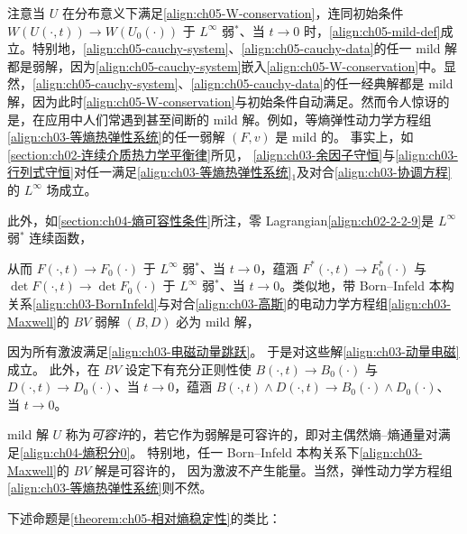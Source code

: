 \documentclass[../../main.tex]{subfiles}
\begin{document}
注意当 $U$ 在分布意义下满足\eqref{align:ch05-W-conservation}，连同初始条件 $W(U(\cdot,t))\to W(U_{0}(\cdot))$ 于 $L^{\infty}$ 弱$^{*}$、当 $t\to0$ 时，\eqref{align:ch05-mild-def}成立。特别地，\eqref{align:ch05-cauchy-system}、\eqref{align:ch05-cauchy-data}的任一 mild 解都是弱解，因为\eqref{align:ch05-cauchy-system}嵌入\eqref{align:ch05-W-conservation}中。显然，\eqref{align:ch05-cauchy-system}、\eqref{align:ch05-cauchy-data}的任一经典解都是 mild 解，因为此时\eqref{align:ch05-W-conservation}与初始条件自动满足。然而令人惊讶的是，在应用中人们常遇到甚至间断的 mild 解。例如，等熵弹性动力学方程组\eqref{align:ch03-等熵热弹性系统}的任一弱解 $(F,v)$ 是 mild 的。
事实上，如\cref{section:ch02-连续介质热力学平衡律}所见，
\eqref{align:ch03-余因子守恒}与\eqref{align:ch03-行列式守恒}对任一满足\eqref{align:ch03-等熵热弹性系统}$_{1}$及对合\eqref{align:ch03-协调方程}的 $L^{\infty}$ 场成立。



此外，如\cref{section:ch04-熵可容性条件}所注，零 Lagrangian\eqref{align:ch02-2-2-9}是 $L^{\infty}$ 弱$^{*}$ 连续函数，

从而 $F(\cdot,t)\to F_{0}(\cdot)$ 于 $L^{\infty}$ 弱$^{*}$、当 $t\to0$，蕴涵 $F^{*}(\cdot,t)\to F_{0}^{*}(\cdot)$ 与 $\det F(\cdot,t)\to\det F_{0}(\cdot)$ 于 $L^{\infty}$ 弱$^{*}$、当 $t\to0$。类似地，带 Born--Infeld 本构关系\eqref{align:ch03-BornInfeld}与对合\eqref{align:ch03-高斯}的电动力学方程组\eqref{align:ch03-Maxwell}的 $BV$ 弱解 $(B,D)$ 必为 mild 解，


因为所有激波满足\eqref{align:ch03-电磁动量跳跃}。
于是对这些解\eqref{align:ch03-动量电磁}成立。
此外，在 $BV$ 设定下有充分正则性使 $B(\cdot,t)\to B_{0}(\cdot)$ 与 $D(\cdot,t)\to D_{0}(\cdot)$、当 $t\to0$，蕴涵 $B(\cdot,t)\wedge D(\cdot,t)\to B_{0}(\cdot)\wedge D_{0}(\cdot)$、当 $t\to0$。

mild 解 $U$ 称为\emph{可容许}的，若它作为弱解是可容许的，即对主偶然熵--熵通量对满足\eqref{align:ch04-熵积分0}。
特别地，任一 Born--Infeld 本构关系下\eqref{align:ch03-Maxwell}的 $BV$ 解是可容许的，
因为激波不产生能量。当然，弹性动力学方程组\eqref{align:ch03-等熵热弹性系统}则不然。

下述命题是\cref{theorem:ch05-相对熵稳定性}的类比：
\end{document}
